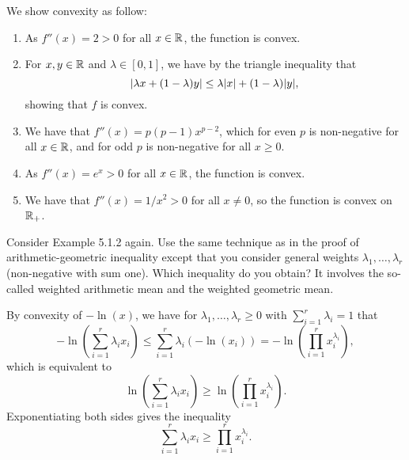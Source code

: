 \begin{solution}\label{sol:5.3}
  We show convexity as follow:
  \begin{enumerate}[label = (\emph{\roman*})]
    \item As $f''(x) = 2 > 0$ for all $x \in \mathbb{R}$, the function is convex.

    \item For $x, y \in \mathbb{R}$ and $\lambda \in [0, 1]$, we have by the triangle inequality that
      \begin{equation}
        \lvert \lambda x + (1 - \lambda) y \rvert
        \leq
        \lambda \lvert x\rvert + (1 - \lambda) \lvert y\rvert,
      \end{equation}
      showing that $f$ is convex.

    \item We have that $f''(x) = p (p - 1) x^{p - 2}$, which for even $p$ is non-negative for all $x \in \mathbb{R}$, and for odd $p$ is non-negative for all $x \geq 0$.

    \item As $f''(x) = e^x > 0$ for all $x \in \mathbb{R}$, the function is convex.

    \item We have that $f''(x) = 1 / x^2 > 0$ for all $x \neq 0$, so the function is convex on $\mathbb{R}_+$.
  \end{enumerate}
\end{solution}

\begin{exercise}
  Consider Example 5.1.2 again.
  Use the same technique as in the proof of arithmetic-geometric inequality except that you consider general weights $\lambda_1, \ldots, \lambda_r$ (non-negative with sum one).
  Which inequality do you obtain?
  It involves the so-called weighted arithmetic mean and the weighted geometric mean.
\end{exercise}

\begin{solution}
  By convexity of $-\ln(x)$, we have for $\lambda_1, \ldots, \lambda_r \geq 0$ with $\sum_{i=1}^r \lambda_i = 1$ that
  \begin{equation}
    -\ln\left( \sum_{i=1}^r \lambda_i x_i \right)
    \leq
    \sum_{i=1}^r \lambda_i (-\ln(x_i))
    = -\ln\left( \prod_{i=1}^r x_i^{\lambda_i} \right),
  \end{equation}
  which is equivalent to
  \begin{equation}
    \ln\left( \sum_{i=1}^r \lambda_i x_i \right)
    \geq
    \ln\left( \prod_{i=1}^r x_i^{\lambda_i} \right).
  \end{equation}
  Exponentiating both sides gives the inequality
  \begin{equation}
    \sum_{i=1}^r \lambda_i x_i
    \geq
    \prod_{i=1}^r x_i^{\lambda_i}.
  \end{equation}
\end{solution}

